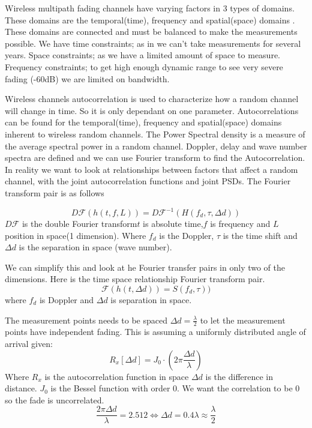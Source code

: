 Wireless multipath fading channels have varying factors in 3 types of domains. These domains are the temporal(time), frequency and spatial(space) domains \citep[p. 40-42]{stochasticWirelessChan}. These domains are connected and must be balanced to make the measurements possible. We have time constraints; as in we can't take measurements for several years. Space constraints; as we have a limited amount of space to measure. Frequency constraints; to get high enough dynamic range to see very severe fading (-60dB) we are limited on bandwidth.

Wireless channels autocorrelation is used to characterize how a random channel will change in time. So it is only dependant on one parameter. Autocorrelations can be found for the temporal(time), frequency and spatial(space) domains inherent to wireless random channels. The Power Spectral density is a measure of the average spectral power in a random channel. Doppler, delay and wave number spectra are defined and we can use Fourier transform to find the Autocorrelation. In reality we want to look at relationships between factors that affect a random channel, with the joint autocorrelation functions and joint PSDs\citep{SpaceWirelessChan}. The Fourier transform pair is as follows


\begin{equation}
D\mathcal{F} ( h(t,f,L) ) =
D\mathcal{F}^{-1} ( H(f_d,\tau,\Delta d) )
\end{equation}
$D\mathcal{F}$ is the double Fourier transform$t$ is absolute time,$f$ is frequency and $L$ position in space(1 dimension).
Where $f_d$ is the Doppler, $\tau$ is the time shift and $\Delta d$ is the separation in space (wave number).

We can simplify this and look at he Fourier transfer pairs in only two of the dimensions. Here is the time space relationship Fourier transform pair.
\begin{equation}
\mathcal{F} ( h(t,\Delta d) ) =
 S(f_d,\tau) )
\end{equation}
where $f_d$ is Doppler and $\Delta d$ is separation in space.

The measurement points needs to be spaced $\Delta d = \frac{\lambda}{2}$ to let the measurement points have independent fading. This is assuming a uniformly distributed angle of arrival given:
\begin{equation}
R_x[\Delta d] = J_0\cdot(2\pi \frac{\Delta d}{\lambda})
\end{equation}
Where $R_x$ is the autocorrelation function in space $\Delta d$ is the difference in distance. $J_0$ is the Bessel function with order 0.
We want the correlation to be 0 so the fade is uncorrelated.
\begin{equation}
\frac{2\pi \Delta d}{\lambda} = 2.512 \Leftrightarrow \Delta d = 0.4 \lambda \approx \frac{\lambda}{2}
\end{equation}

